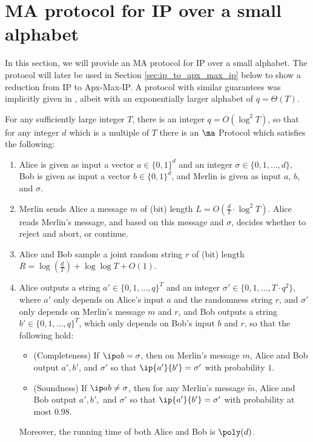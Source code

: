 \documentclass[11pt]{article}
\begin{document}
 
\section{MA protocol for IP over a small alphabet}\label{sec:ma}

In this section, we will provide an MA protocol for IP over a small alphabet. The protocol will later be used in Section \ref{sec:ip_to_apx_max_ip} below to show a reduction from IP to Apx-Max-IP. A  protocol with similar guarantees was implicitly given in \cite{CW19}, albeit with an exponentially larger alphabet of  $q=\Theta(T)$. 

\begin{thm}\label{thm:ma} 
For any sufficiently large integer $T$, there is an integer  $q=O(\log ^2 T)$, so that for 
 any integer $d$ which is a multiple of $T$ there is an $\ma$ Protocol which satisfies the following:
\begin{enumerate}
\item Alice is given as input a vector $a \in\{0,1\}^{d}$  and an integer $\sigma \in \{0,1,\ldots,d\}$,
Bob is given as input a vector $b \in \{0,1\}^{d}$, and Merlin is given as input
$a$, $b$, and $\sigma$.
\item Merlin sends Alice a message $m$ of (bit) length $L=O(\frac d T \cdot \log^2 T)$.
 Alice reads Merlin's message, and based on this message and $\sigma$, decides whether to reject and abort, or continue.
\item Alice and Bob sample a joint random string $r$ of (bit) length $R=\log(\frac{d}{T})+ \log \log T+O(1)$.
\item Alice outputs  a string
$a' \in \{0,1,\ldots,q\}^T$ and an integer $\sigma' \in \{0,1,\ldots, T \cdot q^2\}$, where $a'$ only depends on Alice's input $a$ and the randomness string $r$,  
and $\sigma'$ only depends on Merlin's message $m$ and $r$,  and Bob outputs a string $b' \in \{0,1,\ldots,q\}^T$, which only depends on Bob's input $b$ and  $r$, so that the following hold:
\begin{itemize}
\item (Completeness) If $\ip a b= \sigma$, then on Merlin's message $m$, Alice and Bob output $a', b'$, and $\sigma'$ so that $\ip {a'} {b'} = \sigma'$ with probability $1$. 
\item (Soundness) If $\ip a b \neq \sigma$, then for any Merlin's message $\tilde m$, Alice and Bob output $a', b',$ and $\sigma'$ so that $\ip {a'} {b'} = \sigma'$ with probability at most $0.98$.
\end{itemize}

Moreover, the running time of both Alice and Bob is $\poly(d)$.
\end{enumerate}
\end{thm}
\end{document}
